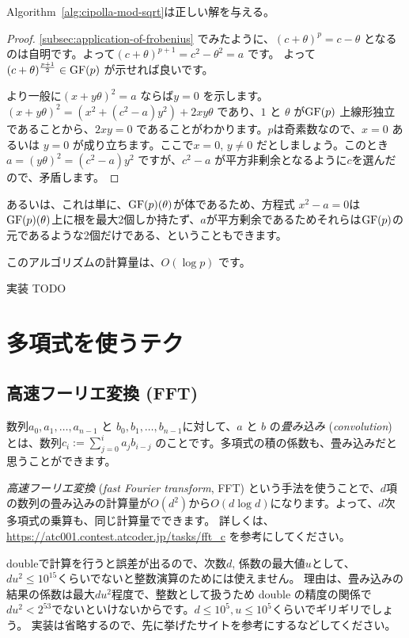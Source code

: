 \documentclass{jsarticle}
\begin{document}
  \begin{proposition}
   Algorithm~\ref{alg:cipolla-mod-sqrt}は正しい解を与える。
  \end{proposition}
  \begin{proof}
   \ref{subsec:application-of-frobenius} でみたように、$(c+\theta)^{p} = c - \theta$ となるのは自明です。よって$(c+\theta)^{p+1} = c^2-\theta^2 = a$ です。
   よって$(c+\theta)^{\frac{p+1}2} \in \mathrm{GF}(p)$ が示せれば良いです。

   より一般に$(x+y\theta)^2 = a$ ならば$y = 0$ を示します。
   $(x+y\theta)^2 = (x^2+(c^2-a)y^2) + 2xy\theta$ であり、$1$ と $\theta$ が$\mathrm{GF}(p)$ 上線形独立であることから、$2xy = 0$ であることがわかります。$p$は奇素数なので、$x=0$ あるいは $y=0$ が成り立ちます。ここで$x = 0$, $y \neq 0$ だとしましょう。このとき$a = (y\theta)^2 = (c^2-a)y^2$ ですが、$c^2-a$ が平方非剰余となるように$c$を選んだので、矛盾します。
  \end{proof}
  \begin{remark}
   あるいは、これは単に、$\mathrm{GF}(p)(\theta)$が体であるため、方程式 $x^2-a = 0$は$\mathrm{GF}(p)(\theta)$上に根を最大2個しか持たず、$a$が平方剰余であるためそれらは$\mathrm{GF}(p)$の元であるような2個だけである、ということもできます。
  \end{remark}
  このアルゴリズムの計算量は、$O(\log p)$ です。

  実装 TODO
 \section{多項式を使うテク~}
 \label{sec:technique-using-polynomials}
  \subsection{高速フーリエ変換 (FFT)~}
  \label{subsec:fft}
  数列$a_0, a_1, \ldots, a_{n-1}$ と $b_0, b_1, \ldots, b_{n-1}$に対して、$a$ と $b$ の\emph{畳み込み} (\emph{convolution}) とは、数列$c_i := \sum_{j=0}^{i} a_jb_{i-j}$ のことです。多項式の積の係数も、畳み込みだと思うことができます。

  \emph{高速フーリエ変換} (\emph{fast Fourier transform}, FFT) という手法を使うことで、$d$項の数列の畳み込みの計算量が$O(d^2)$から$O(d \log d)$になります。よって、$d$次多項式の乗算も、同じ計算量でできます。
  詳しくは、\url{https://atc001.contest.atcoder.jp/tasks/fft_c} を参考にしてください。

  doubleで計算を行うと誤差が出るので、次数$d$, 係数の最大値$u$として、$du^2 \le 10^{15}$くらいでないと整数演算のためには使えません。
  理由は、畳み込みの結果の係数は最大$du^2$程度で、整数として扱うため double の精度の関係で $du^2 < 2^{53}$でないといけないからです。$d \le 10^5, u\le 10^5$くらいでギリギリでしょう。
  実装は省略するので、先に挙げたサイトを参考にするなどしてください。
\end{document}
